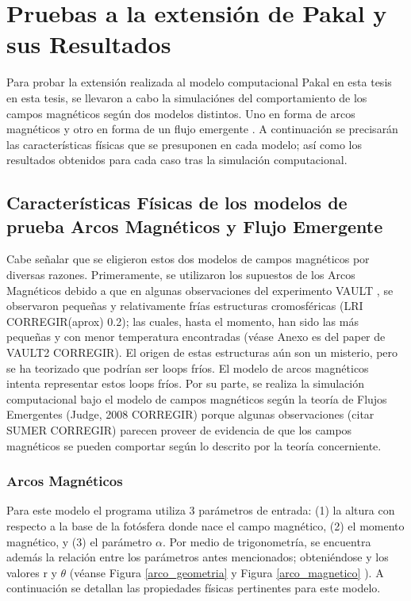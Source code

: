 \documentclass[9pt]{book}
\begin{document}
\chapter{Pruebas a la extensi\'on de Pakal y sus Resultados}

Para probar la extensi\'on realizada al modelo computacional Pakal en esta tesis en esta tesis, se llevaron a cabo la simulaci\'ones del comportamiento de los campos magn\'eticos seg\'un dos modelos distintos. Uno en forma de arcos magn\'eticos \cite{ashwanden} y otro en forma de un flujo emergente \cite{flujoemergente}. A continuaci\'on se precisar\'an las caracter\'isticas f\'isicas que se presuponen en cada modelo; as\'i como los resultados obtenidos para cada caso tras la simulaci\'on computacional.

\section{Caracter\'isticas F\'isicas de los modelos de prueba \- Arcos Magn\'eticos y Flujo Emergente}

Cabe se\~nalar que se eligieron estos dos modelos de campos magn\'eticos por diversas razones. Primeramente, se utilizaron los supuestos de los Arcos Magn\'eticos debido a que en algunas observaciones del experimento VAULT \cite{VAULT1}, se observaron peque\~nas y relativamente fr\'ias estructuras cromosf\'ericas (LRI CORREGIR(aprox) 0.2); las cuales, hasta el momento, han sido las m\'as peque\~nas y con menor temperatura encontradas (v\'ease Anexo es del paper de VAULT2 CORREGIR). El origen de estas estructuras a\'un son un misterio, pero se ha teorizado que podr\'ian ser loops fr\'ios\cite{VAULT2}. El modelo de arcos magn\'eticos intenta representar estos loops fr\'ios. Por su parte, se realiza la simulaci\'on computacional bajo el modelo de campos magn\'eticos seg\'un la teor\'ia de Flujos Emergentes (Judge, 2008 CORREGIR) porque algunas observaciones (citar SUMER CORREGIR) parecen proveer de evidencia de que los campos magn\'eticos se pueden comportar seg\'un lo descrito por la teor\'ia concerniente. 

\subsection{Arcos Magn\'eticos}

Para este modelo el programa utiliza 3 par\'ametros de entrada: (1) la altura con respecto a la base de la fot\'osfera donde nace el campo magn\'etico, (2) el momento magn\'etico, y (3) el par\'ametro $\alpha$. Por medio de trigonometr\'ia, se encuentra adem\'as la relaci\'on entre los par\'ametros antes mencionados; obteni\'endose y los valores r y $\theta$ (v\'eanse Figura \ref{arco_geometria} y Figura \ref{arco_magnetico} ). A continuaci\'on se detallan las propiedades f\'isicas pertinentes para este modelo.
\end{document}
